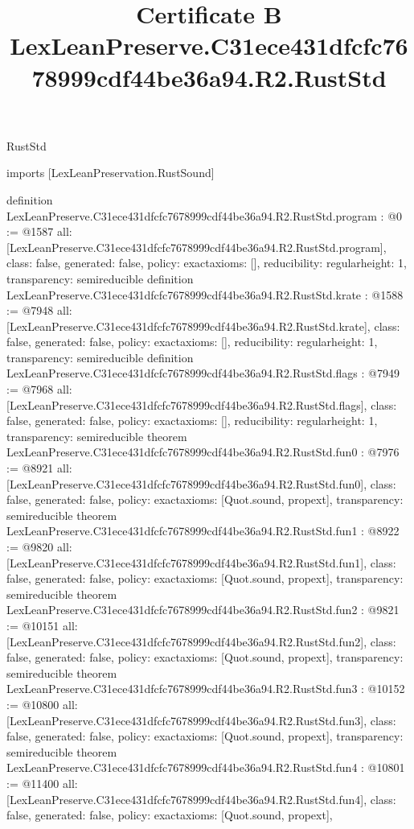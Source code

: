 \begin{lexlean}{RustStd}
\title{Certificate B LexLeanPreserve.C31ece431dfcfc7678999cdf44be36a94.R2.RustStd}
\begin{coremodule}
imports [LexLeanPreservation.RustSound]

definition LexLeanPreserve.C31ece431dfcfc7678999cdf44be36a94.R2.RustStd.program : @0 := @1587 {
  all: [LexLeanPreserve.C31ece431dfcfc7678999cdf44be36a94.R2.RustStd.program],
  class: false,
  generated: false,
  policy: exact{axioms: []},
  reducibility: regular{height: 1},
  transparency: semireducible
}
definition LexLeanPreserve.C31ece431dfcfc7678999cdf44be36a94.R2.RustStd.krate : @1588 := @7948 {
  all: [LexLeanPreserve.C31ece431dfcfc7678999cdf44be36a94.R2.RustStd.krate],
  class: false,
  generated: false,
  policy: exact{axioms: []},
  reducibility: regular{height: 1},
  transparency: semireducible
}
definition LexLeanPreserve.C31ece431dfcfc7678999cdf44be36a94.R2.RustStd.flags : @7949 := @7968 {
  all: [LexLeanPreserve.C31ece431dfcfc7678999cdf44be36a94.R2.RustStd.flags],
  class: false,
  generated: false,
  policy: exact{axioms: []},
  reducibility: regular{height: 1},
  transparency: semireducible
}
theorem LexLeanPreserve.C31ece431dfcfc7678999cdf44be36a94.R2.RustStd.fun0 : @7976 := @8921 {
  all: [LexLeanPreserve.C31ece431dfcfc7678999cdf44be36a94.R2.RustStd.fun0],
  class: false,
  generated: false,
  policy: exact{axioms: [Quot.sound, propext]},
  transparency: semireducible
}
theorem LexLeanPreserve.C31ece431dfcfc7678999cdf44be36a94.R2.RustStd.fun1 : @8922 := @9820 {
  all: [LexLeanPreserve.C31ece431dfcfc7678999cdf44be36a94.R2.RustStd.fun1],
  class: false,
  generated: false,
  policy: exact{axioms: [Quot.sound, propext]},
  transparency: semireducible
}
theorem LexLeanPreserve.C31ece431dfcfc7678999cdf44be36a94.R2.RustStd.fun2 : @9821 := @10151 {
  all: [LexLeanPreserve.C31ece431dfcfc7678999cdf44be36a94.R2.RustStd.fun2],
  class: false,
  generated: false,
  policy: exact{axioms: [Quot.sound, propext]},
  transparency: semireducible
}
theorem LexLeanPreserve.C31ece431dfcfc7678999cdf44be36a94.R2.RustStd.fun3 : @10152 := @10800 {
  all: [LexLeanPreserve.C31ece431dfcfc7678999cdf44be36a94.R2.RustStd.fun3],
  class: false,
  generated: false,
  policy: exact{axioms: [Quot.sound, propext]},
  transparency: semireducible
}
theorem LexLeanPreserve.C31ece431dfcfc7678999cdf44be36a94.R2.RustStd.fun4 : @10801 := @11400 {
  all: [LexLeanPreserve.C31ece431dfcfc7678999cdf44be36a94.R2.RustStd.fun4],
  class: false,
  generated: false,
  policy: exact{axioms: [Quot.sound, propext]},
}
\end{coremodule}
\end{lexlean}
